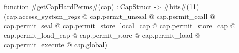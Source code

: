 function #\hyperref[zgetCapHardPerms]{getCapHardPerms}#(cap) : CapStruct -> #\hyperref[zbits]{bits}#(11) =
   (cap.access_system_regs
  @ cap.permit_unseal
  @ cap.permit_ccall
  @ cap.permit_seal
  @ cap.permit_store_local_cap
  @ cap.permit_store_cap
  @ cap.permit_load_cap
  @ cap.permit_store
  @ cap.permit_load
  @ cap.permit_execute
  @ cap.global)

